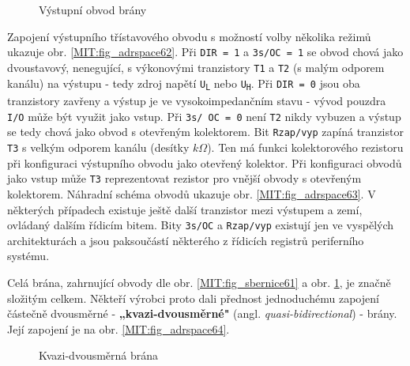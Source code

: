       \begin{figure}[ht!]
        \centering  
        \caption{Výstupní obvod brány}
        \label{MIT:fig_sbernice6263}
      \end{figure}
      
      Zapojení výstupního třístavového obvodu s možností volby několika režimů ukazuje obr.
      \ref{MIT:fig_adrspace62}. Při \texttt{DIR = 1} a \texttt{3s/OC = 1} se obvod chová jako
      dvoustavový, nenegující, s výkonovými tranzistory \texttt{T1} a \texttt{T2} (s malým odporem
      kanálu) na výstupu - tedy zdroj napětí \texttt{U\textsubscript{L}} nebo
      \texttt{U\textsubscript{H}}. Při \texttt{DIR = 0} jsou oba tranzistory zavřeny a výstup je ve
      vysokoimpedančním stavu - vývod pouzdra \texttt{I/O} může být využit jako vstup. Při
      \texttt{3s/ OC = 0} není \texttt{T2} nikdy vybuzen a výstup se tedy chová jako obvod s
      otevřeným kolektorem. Bit \texttt{Rzap/vyp} zapíná tranzistor \texttt{T3} s velkým odporem
      kanálu (desítky \(k\Omega\)). Ten má funkci kolektorového rezistoru při konfiguraci výstupního
      obvodu jako otevřený kolektor. Při konfiguraci obvodů jako vstup může \texttt{T3}
      reprezentovat rezistor pro vnější obvody s otevřeným kolektorem. Náhradní schéma obvodů
      ukazuje obr. \ref{MIT:fig_adrspace63}. V některých případech existuje ještě další tranzistor
      mezi výstupem a zemí, ovládaný dalším řídicím bitem. Bity \texttt{3s/OC} a \texttt{Rzap/vyp}
      existují jen ve vyspělých architekturách a jsou paksoučástí některého z řídicích registrů
      periferního systému.
      
      Celá brána, zahrnující obvody dle obr. \ref{MIT:fig_sbernice61} a obr.
      \ref{MIT:fig_sbernice6263}, je značně složitým celkem. Někteří výrobci proto dali přednost
      jednoduchému zapojení částečně dvousměrné - \textbf{„kvazi-dvousměrné"} (angl.
      \emph{quasi-bidirectional}) - brány. Její zapojení je na obr. \ref{MIT:fig_adrspace64}.
      
      \begin{figure}[ht!]
        \centering  
        \caption{Kvazi-dvousměrná brána}
        \label{MIT:fig_sbernice6465}
      \end{figure}
      
